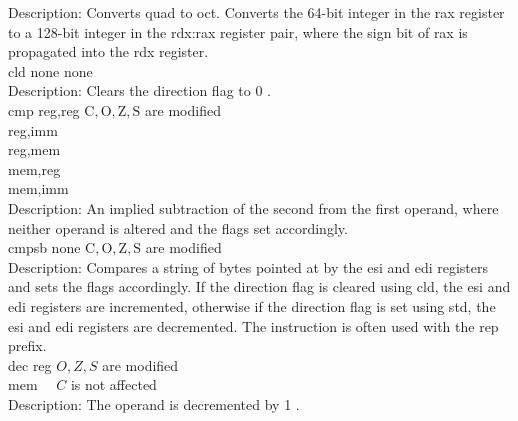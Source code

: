 \documentclass[10pt]{article}
\begin{document}
Description: Converts quad to oct. Converts the 64-bit integer in the rax register to a 128-bit integer in the rdx:rax register pair, where the sign bit of rax is propagated into the rdx register.\\
cld none none\\
Description: Clears the direction flag to 0 .\\
cmp reg,reg $\mathrm{C}, \mathrm{O}, \mathrm{Z}, \mathrm{S}$ are modified\\
reg,imm\\
reg,mem\\
mem,reg\\
mem,imm\\
Description: An implied subtraction of the second from the first operand, where neither operand is altered and the flags set accordingly.\\
cmpsb none $\mathrm{C}, \mathrm{O}, \mathrm{Z}, \mathrm{S}$ are modified\\
Description: Compares a string of bytes pointed at by the esi and edi registers and sets the flags accordingly. If the direction flag is cleared using cld, the esi and edi registers are incremented, otherwise if the direction flag is set using std, the esi and edi registers are decremented. The instruction is often used with the rep prefix.\\
dec reg $O, Z, S$ are modified\\
mem $\quad C$ is not affected\\
Description: The operand is decremented by 1 .
\end{document}
